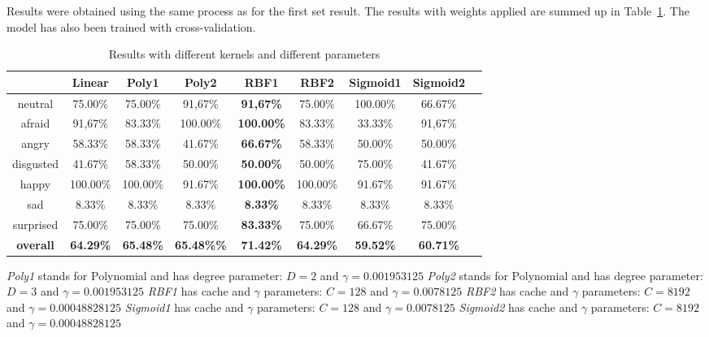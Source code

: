 \noindent Results were obtained using the same process as for the first set result. The results with weights applied are summed up in Table~\ref{table_results_kernels_weight}. The model has also been trained with cross-validation.
\newline

\begin{table}[h]
\begin{center}
   \caption{\label{table_results_kernels_weight} Results with different kernels and different parameters}
\begin{tabular}{|c|c|c|c|c|c|c|c|c|}
  \hline
    & Linear & \textbf{Poly1} & Poly2 & RBF1 & RBF2 & Sigmoid1 & Sigmoid2 \\
  \hline
  neutral & 75.00\% & 75.00\% & 91,67\% & \textbf{91,67\%} & 75.00\% & 100.00\% & 66.67\% \\
  afraid & 91,67\% & 83.33\% & 100.00\% & \textbf{100.00\%} & 83.33\% & 33.33\% & 91,67\% \\
  angry & 58.33\% & 58.33\% & 41.67\% & \textbf{66.67\%} & 58.33\% & 50.00\% & 50.00\% \\
  disgusted & 41.67\% & 58.33\% & 50.00\% & \textbf{50.00\%} & 50.00\% & 75.00\% & 41.67\% \\
  happy & 100.00\% & 100.00\% & 91.67\% & \textbf{100.00\%} & 100.00\% & 91.67\% & 91.67\% \\
  sad & 8.33\% & 8.33\% & 8.33\% & \textbf{8.33\%} & 8.33\% & 8.33\% & 8.33\% \\
  surprised & 75.00\% & 75.00\% & 75.00\% & \textbf{83.33\%} & 75.00\% & 66.67\% & 75.00\% \\
  \textbf{overall} & \textbf{64.29\%} & \textbf{65.48\%} & \textbf{{65.48\%}\%} & \textbf{{\color{red}71.42\%}} & \textbf{64.29\%} & \textbf{59.52\%} & \textbf{60.71\%} \\
  \hline
\end{tabular}
\end{center} 
\end{table}

\noindent \textit{Poly1} stands for Polynomial and has degree parameter: $ D = 2 $ and $ \gamma = 0.001953125 $
\newline
\noindent \textit{Poly2} stands for Polynomial and has degree parameter: $ D = 3 $ and $ \gamma = 0.001953125 $
\newline
\noindent \textit{RBF1} has cache and $\gamma$ parameters: $ C = 128 $ and $ \gamma = 0.0078125 $
\newline
\noindent \textit{RBF2} has cache and $\gamma$ parameters: $ C = 8192 $ and $ \gamma = 0.00048828125 $ 
\newline
\noindent \textit{Sigmoid1} has cache and $\gamma$ parameters: $ C = 128 $ and $ \gamma = 0.0078125 $
\newline
\noindent \textit{Sigmoid2} has cache and $\gamma$ parameters: $ C = 8192 $ and $ \gamma = 0.00048828125 $
\newline

